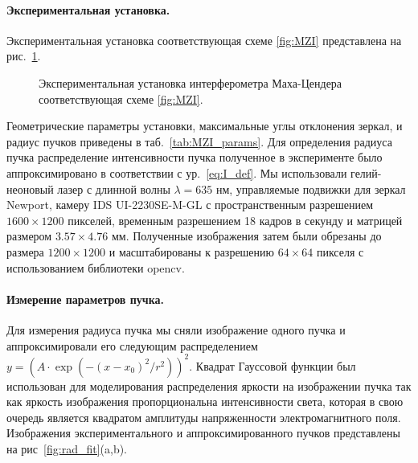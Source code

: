 \paragraph{Экспериментальная установка.} Экспериментальная установка соответствующая схеме \ref{fig:MZI} представлена на рис.~\ref{fig:MZI_exp}. 

\begin{figure}[ht]
\caption{Экспериментальная установка интерферометра Маха-Цендера соответствующая схеме \ref{fig:MZI}.}
\label{fig:MZI_exp}
\end{figure}

Геометрические параметры установки, максимальные углы отклонения зеркал, и радиус пучков приведены в таб.~\ref{tab:MZI_params}. Для определения радиуса пучка распределение интенсивности пучка полученное в эксперименте было аппроксимировано в соответствии с ур.~\eqref{eq:I_def}. Мы использовали гелий-неоновый  лазер с длинной волны $\lambda =  635$ нм, управляемые подвижки для зеркал Newport, 
камеру IDS UI-2230SE-M-GL с пространственным разрешением $1600\times1200$ пикселей, временным разрешением 18 кадров в секунду и матрицей размером $3.57\times4.76$ мм. Полученные изображения затем были обрезаны до размера $1200\times1200$ и масштабированы к разрешению $64\times64$ пикселя с использованием библиотеки opencv.

\paragraph{Измерение параметров пучка.}
Для измерения радиуса пучка мы сняли изображение одного пучка и аппроксимировали его следующим распределением $y = \left( A \cdot \exp(-(x - x_0)^2 / r^2) \right) ^2$. Квадрат Гауссовой функции был использован для моделирования распределения яркости на изображении пучка так как яркость изображения пропорциональна интенсивности света, которая в свою очередь является квадратом амплитуды напряженности электромагнитного поля. Изображения экспериментального и аппроксимированного пучков представлены на рис~\ref{fig:rad_fit}(a,b). 


